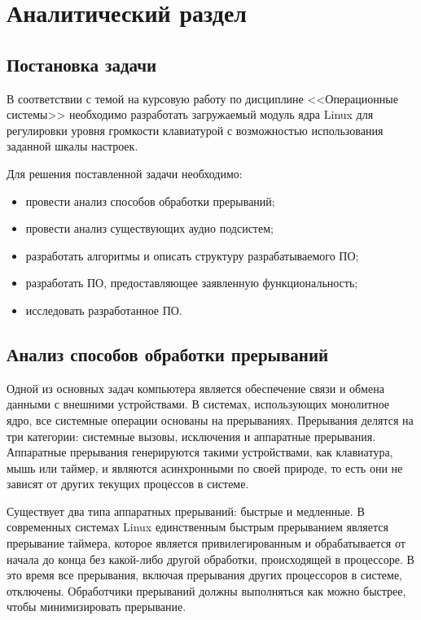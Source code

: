 \chapter{Аналитический раздел}

\section{Постановка задачи}

В соответствии с темой на курсовую работу по дисциплине <<Операционные системы>> необходимо разработать загружаемый модуль ядра Linux для регулировки уровня громкости клавиатурой с возможностью использования заданной шкалы настроек.

Для решения поставленной задачи необходимо:
\begin{itemize}
    \item провести анализ способов обработки прерываний;
    \item провести анализ существующих аудио подсистем;
    \item разработать алгоритмы и описать структуру разрабатываемого ПО;
    \item разработать ПО, предоставляющее заявленную функциональность;
    \item исследовать разработанное ПО.
\end{itemize}

\section{Анализ способов обработки прерываний}

Одной из основных задач компьютера является обеспечение связи и обмена данными с внешними устройствами. В системах, использующих монолитное ядро, все системные операции основаны на прерываниях. Прерывания делятся на три категории: системные вызовы, исключения и аппаратные прерывания. Аппаратные прерывания генерируются такими устройствами, как клавиатура, мышь или таймер, и являются асинхронными по своей природе, то есть они не зависят от других текущих процессов в системе.

Существует два типа аппаратных прерываний: быстрые и медленные. В современных системах Linux единственным быстрым прерыванием является прерывание таймера, которое является привилегированным и обрабатывается от начала до конца без какой-либо другой обработки, происходящей в процессоре. В это время все прерывания, включая прерывания других процессоров в системе, отключены. Обработчики прерываний должны выполняться как можно быстрее, чтобы минимизировать прерывание.

